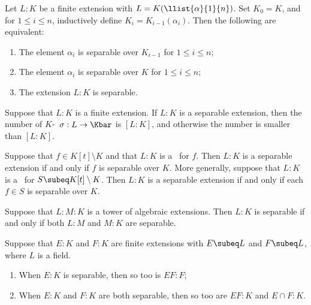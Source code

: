 \documentclass{article}
\begin{document}
  \begin{ttheorem}
    Let \( L:K \) be a finite extension with \( L=K(\llist{\alpha}{1}{n}) \). Set \( K_0=K \), and for \( 1\leq i\leq n \), inductively define \( K_i=K_{i-1}(\alpha_i) \). Then the following are equivalent:
    \begin{enumerate}[label=(\roman*)]
      \item The element \( \alpha_i \) is separable over \( K_{i-1} \) for \( 1\leq i\leq n \);
      \item The element \( \alpha_i \) is separable over \( K \) for \( 1\leq i\leq n \);
      \item The extension \( L:K \) is separable.
    \end{enumerate}
  \end{ttheorem}

  \begin{tcorollary}
    Suppose that \( L:K \) is a finite extension. If \( L:K \) is a separable extension, then the number of \( K \)-\homo~\( \sigma:L\to\Kbar \) is \( [L:K] \), and otherwise the number is smaller than \( [L:K] \).
  \end{tcorollary}

  \begin{tcorollary}
    Suppose that \( f\in K[t]\setminus K \) and that \( L:K \) is a \sfe~for \( f \). Then \( L:K \) is a separable extension if and only if \( f \) is separable over \( K \). More generally, suppose that \( L:K \) is a \sfe~for \( S\subeq K[t]\setminus K \). Then \( L:K \) is a separable extension if and only if each \( f\in S \) is separable over \( K \).
  \end{tcorollary}

  \begin{ttheorem}
    Suppose that \( L:M:K \) is a tower of algebraic extensions. Then \( L:K \) is separable if and only if both \( L:M \) and \( M:K \) are separable.
  \end{ttheorem}

  \begin{ttheorem}
    Suppose that \( E:K \) and \( F:K \) are finite extensions with \( E\subeq L \) and \( F\subeq L \), where \( L \) is a field.
    \begin{enumerate}[label=(\alph*)]
      \item When \( E:K \) is separable, then so too is \( EF:F \);
      \item When \( E:K \) and \( F:K \) are both separable, then so too are \( EF:K \) and \( E\cap F:K \).
    \end{enumerate}
  \end{ttheorem}
\end{document}
